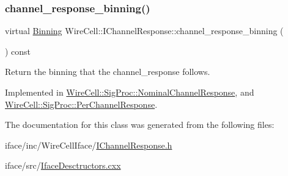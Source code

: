 \subsubsection{\texorpdfstring{channel\+\_\+response\+\_\+binning()}{channel\_response\_binning()}}
{\footnotesize\ttfamily virtual \hyperlink{class_wire_cell_1_1_binning}{Binning} Wire\+Cell\+::\+I\+Channel\+Response\+::channel\+\_\+response\+\_\+binning (\begin{DoxyParamCaption}{ }\end{DoxyParamCaption}) const\hspace{0.3cm}{\ttfamily [pure virtual]}}



Return the binning that the channel\+\_\+response follows. 



Implemented in \hyperlink{class_wire_cell_1_1_sig_proc_1_1_nominal_channel_response_a542dd1589356f39690c01ec012c21c48}{Wire\+Cell\+::\+Sig\+Proc\+::\+Nominal\+Channel\+Response}, and \hyperlink{class_wire_cell_1_1_sig_proc_1_1_per_channel_response_ab5b6e69f75c2847269b1a0c6c4992709}{Wire\+Cell\+::\+Sig\+Proc\+::\+Per\+Channel\+Response}.



The documentation for this class was generated from the following files\+:\begin{DoxyCompactItemize}
\item 
iface/inc/\+Wire\+Cell\+Iface/\hyperlink{_i_channel_response_8h}{I\+Channel\+Response.\+h}\item 
iface/src/\hyperlink{_iface_desctructors_8cxx}{Iface\+Desctructors.\+cxx}\end{DoxyCompactItemize}
